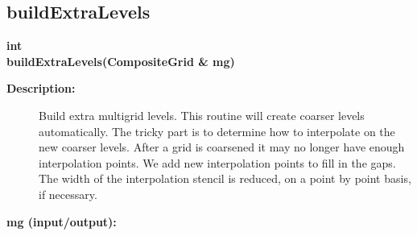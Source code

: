 \subsection{buildExtraLevels}
 
\begin{flushleft} \textbf{%
int  \\ 
\settowidth{\OgmgIncludeArgIndent}{buildExtraLevels(}%
buildExtraLevels(CompositeGrid \& mg)
}\end{flushleft}
\begin{description}
\item[{\bf Description:}]  
       Build extra multigrid levels. This routine will create coarser levels automatically.
 The tricky part is to determine how to interpolate on the new coarser levels.
 After a grid is coarsened it may no longer have enough interpolation points. We add new interpolation
 points to fill in the gaps. The width of the interpolation stencil is reduced, on a point by point
 basis, if necessary.

\item[{\bf mg (input/output):}]  
\end{description}
